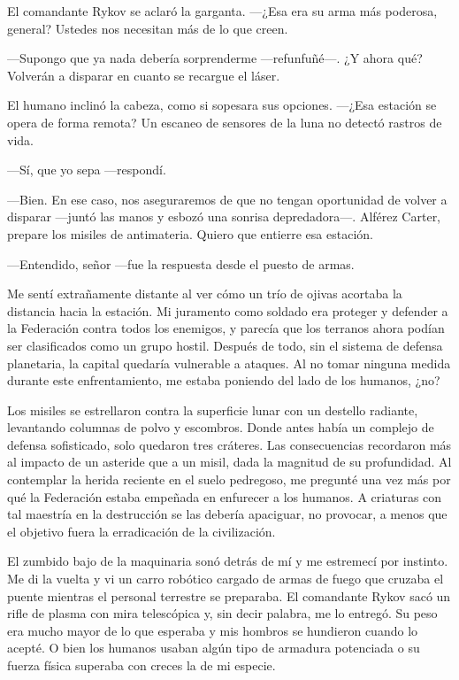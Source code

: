 El comandante Rykov se aclaró la garganta. —¿Esa era su arma más poderosa, general? Ustedes nos necesitan más de lo que creen.

—Supongo que ya nada debería sorprenderme —refunfuñé—. ¿Y ahora qué? Volverán a disparar en cuanto se recargue el láser.

El humano inclinó la cabeza, como si sopesara sus opciones. —¿Esa estación se opera de forma remota? Un escaneo de sensores de la luna no detectó rastros de vida.

—Sí, que yo sepa —respondí.

—Bien. En ese caso, nos aseguraremos de que no tengan oportunidad de volver a disparar —juntó las manos y esbozó una sonrisa depredadora—. Alférez Carter, prepare los misiles de antimateria. Quiero que entierre esa estación.

—Entendido, señor —fue la respuesta desde el puesto de armas.

Me sentí extrañamente distante al ver cómo un trío de ojivas acortaba la distancia hacia la estación. Mi juramento como soldado era proteger y defender a la Federación contra todos los enemigos, y parecía que los terranos ahora podían ser clasificados como un grupo hostil. Después de todo, sin el sistema de defensa planetaria, la capital quedaría vulnerable a ataques. Al no tomar ninguna medida durante este enfrentamiento, me estaba poniendo del lado de los humanos, ¿no?

Los misiles se estrellaron contra la superficie lunar con un destello radiante, levantando columnas de polvo y escombros. Donde antes había un complejo de defensa sofisticado, solo quedaron tres cráteres. Las consecuencias recordaron más al impacto de un asteride que a un misil, dada la magnitud de su profundidad. Al contemplar la herida reciente en el suelo pedregoso, me pregunté una vez más por qué la Federación estaba empeñada en enfurecer a los humanos. A criaturas con tal maestría en la destrucción se las debería apaciguar, no provocar, a menos que el objetivo fuera la erradicación de la civilización.

El zumbido bajo de la maquinaria sonó detrás de mí y me estremecí por instinto. Me di la vuelta y vi un carro robótico cargado de armas de fuego que cruzaba el puente mientras el personal terrestre se preparaba. El comandante Rykov sacó un rifle de plasma con mira telescópica y, sin decir palabra, me lo entregó. Su peso era mucho mayor de lo que esperaba y mis hombros se hundieron cuando lo acepté. O bien los humanos usaban algún tipo de armadura potenciada o su fuerza física superaba con creces la de mi especie.

